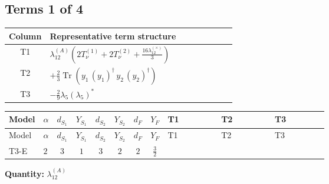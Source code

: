 \documentclass[8pt]{article}
\begin{document}
\begin{landscape}
\subsection*{Terms 1 of 4}
\begin{center}
\begin{tabular}{@{}c >{\raggedright\arraybackslash}p{0.82\linewidth}@{}}
\toprule
Column & Representative term structure \\
\midrule
T1 & \(\displaystyle {\lambda_{12}^{(A)}} \left(2 T_{\nu}^{(1)}+2 T_{\nu}^{(2)}+\frac{16 {\lambda_{12}^{(\times)}}}{3}\right)\) \\
\midrule
T2 & \(\displaystyle +\frac{2}{3} \operatorname{Tr}\!\left({y_1}\,\left({y_1}\right)^{\dagger}\,{y_2}\,\left({y_2}\right)^{\dagger}\right)\) \\
\midrule
T3 & \(\displaystyle -\frac{2}{9} {\lambda_5} \left({\lambda_5}\right)^{*}\) \\
\midrule
\bottomrule
\end{tabular}
\end{center}
\smallskip
\tiny
\begin{longtable}{@{}llcccccc >{\raggedright\arraybackslash}p{0.21\linewidth} >{\raggedright\arraybackslash}p{0.21\linewidth} >{\raggedright\arraybackslash}p{0.21\linewidth}@{}}
\toprule
Model & $\alpha$ & $d_{S_1}$ & $Y_{S_1}$ & $d_{S_2}$ & $Y_{S_2}$ & $d_F$ & $Y_F$ & T1 & T2 & T3 \\
\midrule
\endfirsthead
\toprule
Model & $\alpha$ & $d_{S_1}$ & $Y_{S_1}$ & $d_{S_2}$ & $Y_{S_2}$ & $d_F$ & $Y_F$ & T1 & T2 & T3 \\
\midrule
\endhead
T3-E & $2$ & $3$ & $1$ & $3$ & $2$ & $2$ & $\frac{3}{2}$ & \scriptsize\adjustbox{max width=\linewidth}{$\begin{gathered} {\lambda_{12}^{(A)}} \left(2 T_{\nu}^{(1)}+2 T_{\nu}^{(2)}+\frac{16 {\lambda_{12}^{(\times)}}}{3}\right)\end{gathered}$} & \scriptsize\adjustbox{max width=\linewidth}{$\begin{gathered} +\frac{2}{3} \operatorname{Tr}\!\left({y_1}\,\left({y_1}\right)^{\dagger}\,{y_2}\,\left({y_2}\right)^{\dagger}\right)\end{gathered}$} & \scriptsize\adjustbox{max width=\linewidth}{$\begin{gathered} -\frac{2}{9} {\lambda_5} \left({\lambda_5}\right)^{*}\end{gathered}$} \\
\midrule
\bottomrule
\end{longtable}
\clearpage
\noindent\textbf{Quantity: }$\lambda_{12}^{(A)}$\par\smallskip

\end{landscape}
\end{document}
